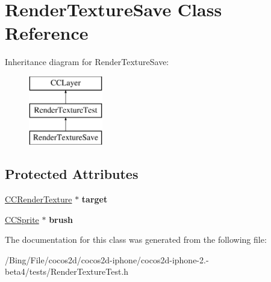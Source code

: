 \hypertarget{interface_render_texture_save}{\section{Render\-Texture\-Save Class Reference}
\label{interface_render_texture_save}
}
Inheritance diagram for Render\-Texture\-Save\-:\begin{figure}[H]
\begin{center}
\leavevmode
\includegraphics[height=3.000000cm]{interface_render_texture_save}
\end{center}
\end{figure}
\subsection*{Protected Attributes}
\begin{DoxyCompactItemize}
\item 
\hypertarget{interface_render_texture_save_a7d63d151f2a682d67ad1e99339d5451d}{\hyperlink{class_c_c_render_texture}{C\-C\-Render\-Texture} $\ast$ {\bfseries target}}\label{interface_render_texture_save_a7d63d151f2a682d67ad1e99339d5451d}

\item 
\hypertarget{interface_render_texture_save_ab439e991142a23ba95a58b56ef0a3b16}{\hyperlink{class_c_c_sprite}{C\-C\-Sprite} $\ast$ {\bfseries brush}}\label{interface_render_texture_save_ab439e991142a23ba95a58b56ef0a3b16}

\end{DoxyCompactItemize}


The documentation for this class was generated from the following file\-:\begin{DoxyCompactItemize}
\item 
/\-Bing/\-File/cocos2d/cocos2d-\/iphone/cocos2d-\/iphone-\/2.-\/beta4/tests/Render\-Texture\-Test.\-h\end{DoxyCompactItemize}
